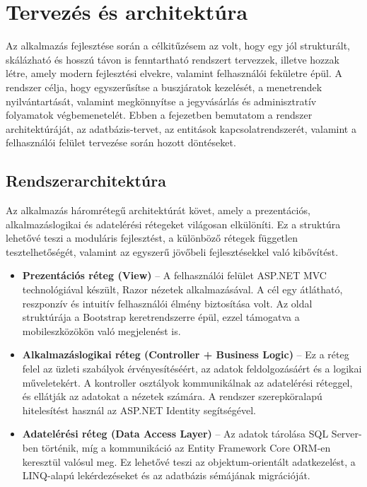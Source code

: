 \section{Tervezés és architektúra}

\indent Az alkalmazás fejlesztése során a célkitűzésem az volt, hogy egy jól strukturált, skálázható és hosszú távon is fenntartható rendszert tervezzek, illetve hozzak létre, amely modern fejlesztési elvekre, valamint felhasználói fekületre épül. A rendszer célja, hogy egyszerűsítse a buszjáratok kezelését, a menetrendek nyilvántartását, valamint megkönnyítse a jegyvásárlás és adminisztratív folyamatok végbemenetelét. Ebben a fejezetben bemutatom a rendszer architektúráját, az adatbázis-tervet, az entitások kapcsolatrendszerét, valamint a felhasználói felület tervezése során hozott döntéseket.

\subsection{Rendszerarchitektúra}

\indent Az alkalmazás háromrétegű architektúrát követ, amely a prezentációs, alkalmazáslogikai és adatelérési rétegeket világosan elkülöníti. Ez a struktúra lehetővé teszi a moduláris fejlesztést, a különböző rétegek független tesztelhetőségét, valamint az egyszerű jövőbeli fejlesztésekkel való kibővítést.

\begin{itemize}
    \item \textbf{Prezentációs réteg (View)} – A felhasználói felület ASP.NET MVC technológiával készült, Razor nézetek alkalmazásával. A cél egy átlátható, reszponzív és intuitív felhasználói élmény biztosítása volt. Az oldal struktúrája a Bootstrap keretrendszerre épül, ezzel támogatva a mobileszközökön való megjelenést is.
    
    \item \textbf{Alkalmazáslogikai réteg (Controller + Business Logic)} – Ez a réteg felel az üzleti szabályok érvényesítéséért, az adatok feldolgozásáért és a logikai műveletekért. A kontroller osztályok kommunikálnak az adatelérési réteggel, és ellátják az adatokat a nézetek számára. A rendszer szerepköralapú hitelesítést használ az ASP.NET Identity segítségével.

    \item \textbf{Adatelérési réteg (Data Access Layer)} – Az adatok tárolása SQL Server-ben történik, míg a kommunikáció az Entity Framework Core ORM-en keresztül valósul meg. Ez lehetővé teszi az objektum-orientált adatkezelést, a LINQ-alapú lekérdezéseket és az adatbázis sémájának migrációját.
\end{itemize}

